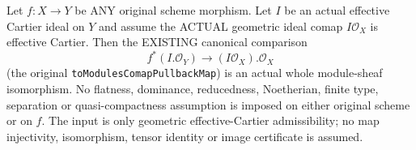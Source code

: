 \begin{theorem}
\label{thm:admissible-cartier-canonical-module-pullback}
\leanok
{}
Let $f:X\to Y$ be ANY original scheme morphism. Let $I$ be an actual
effective Cartier ideal on $Y$ and assume the ACTUAL geometric ideal
comap $I\mathcal O_X$ is effective Cartier. Then the EXISTING canonical
comparison
\[f^*(I.\mathcal O_Y)\longrightarrow (I\mathcal O_X).\mathcal O_X\]
(the original \texttt{toModulesComapPullbackMap}) is an actual whole
module-sheaf isomorphism. No flatness, dominance, reducedness,
Noetherian, finite type, separation or quasi-compactness assumption
is imposed on either original scheme or on $f$.
The input is only geometric effective-Cartier admissibility; no map
injectivity, isomorphism, tensor identity or image certificate is assumed.
\end{theorem}
